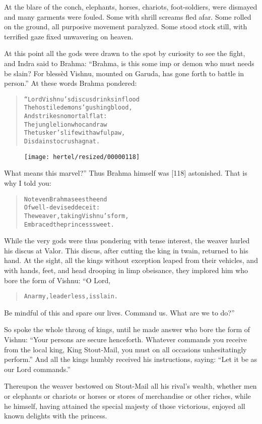 \documentclass[article, twoside, 10pt]{memoir}
\renewenvironment{verbatim}{%
\begin{quote}%
\vskip -10pt%
\begin{alltt}\normalfont\small}{\end{alltt}%
\end{quote}%
\vskip -10pt
} %
\begin{document}
At the blare of the conch, elephants, horses, chariots,
foot-soldiers, were dismayed and many garments were fouled. Some
with shrill screams fled afar. Some rolled on the ground, all
purposive movement paralyzed. Some stood stock still, with
terrified gaze fixed unwavering on heaven.

At this point all the gods were drawn to the spot by curiosity to
see the fight, and Indra said to Brahma:
``Brahma, is this some imp or demon who must needs be slain? For blessèd Vishnu, mounted on Garuda, has gone forth to battle in person.''
At these words Brahma pondered:

\begin{verbatim}
“Lord Vishnu's discus drinks in flood
The hostile demons' gushing blood,
    And strikes no mortal flat:
The jungle lion who can draw
The tusker's life with awful paw,
    Disdains to crush a gnat.
\end{verbatim}
\begin{figure}[p]\texttt{[image: hertel/resized/00000118]}\end{figure}What means this marvel?” Thus Brahma himself was [118] astonished.
That is why I told you:

\begin{verbatim}
Not even Brahma sees the end
    Of well-devised deceit:
The weaver, taking Vishnu's form,
    Embraced the princess sweet.
\end{verbatim}
While the very gods were thus pondering with tense interest, the
weaver hurled his discus at Valor. This discus, after cutting the
king in twain, returned to his hand. At the sight, all the kings
without exception leaped from their vehicles, and with hands, feet,
and head drooping in limp obeisance, they implored him who bore the
form of Vishnu: “O Lord,

\begin{verbatim}
An army, leaderless, is slain.
\end{verbatim}
Be mindful of this and spare our lives. Command us. What are we to
do?”

So spoke the whole throng of kings, until he made answer who bore
the form of Vishnu:
``Your persons are secure henceforth. Whatever commands you receive from the local king, King Stout-Mail, you must on all occasions unhesitatingly perform.''
And all the kings humbly received his instructions, saying:
``Let it be as our Lord commands.''

Thereupon the weaver bestowed on Stout-Mail all his rival's wealth,
whether men or elephants or chariots or horses or stores of
merchandise or other riches, while he himself, having attained the
special majesty of those victorious, enjoyed all known delights
with the princess.
\end{document}
